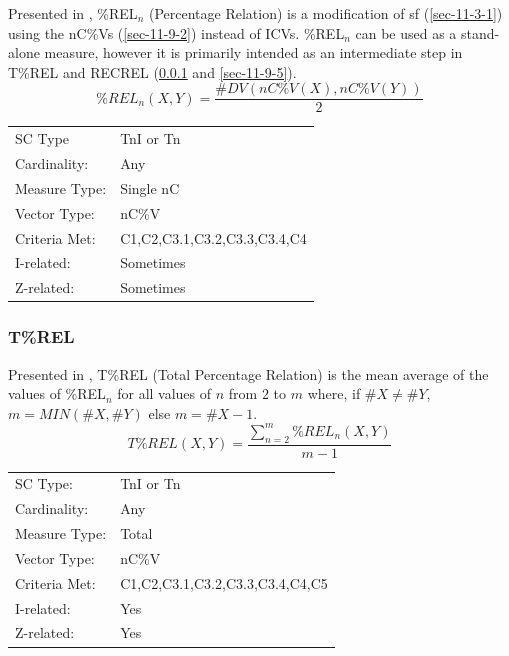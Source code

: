\documentclass{article}
\begin{document}
Presented in \citet{Castren1994}, \%REL$_{n}$ (Percentage Relation) is a
modification of sf (\ref{sec-11-3-1}) using the nC\%Vs (\ref{sec-11-9-2}) instead of
ICVs. \%REL$_{n}$ can be used as a stand-alone measure, however it is
primarily intended as an intermediate step in T\%REL and RECREL (\ref{sec-11-9-4}
and \ref{sec-11-9-5}). $$\%REL_n(X,Y)=\frac{\#DV(nC\%V(X),nC\%V(Y))}{2}$$

\begin{center}
\begin{tabular}{ll}
 SC Type        &  TnI or Tn                     \\
 Cardinality:   &  Any                           \\
 Measure Type:  &  Single nC                     \\
 Vector Type:   &  nC\%V                         \\
 Criteria Met:  &  C1,C2,C3.1,C3.2,C3.3,C3.4,C4  \\
 I-related:     &  Sometimes                     \\
 Z-related:     &  Sometimes                     \\
\end{tabular}
\end{center}
\subsubsection{T\%REL}
\label{sec-11-9-4}

Presented in \citet{Castren1994}, T\%REL (Total Percentage Relation) is
the mean average of the values of \%REL$_{n}$ for all values of $n$ from
$2$ to $m$ where, if $\#X\neq\#Y$, $m = MIN(\#X,\#Y)$ else $m=\#X-1$.
$$T\%REL(X,Y)=\frac{\sum_{n=2}^{m}{\%REL_n\left(X,Y\right)}}{m-1}$$

\begin{center}
\begin{tabular}{ll}
 SC Type:       &  TnI or Tn                        \\
 Cardinality:   &  Any                              \\
 Measure Type:  &  Total                            \\
 Vector Type:   &  nC\%V                            \\
 Criteria Met:  &  C1,C2,C3.1,C3.2,C3.3,C3.4,C4,C5  \\
 I-related:     &  Yes                              \\
 Z-related:     &  Yes                              \\
\end{tabular}
\end{center}
\end{document}
